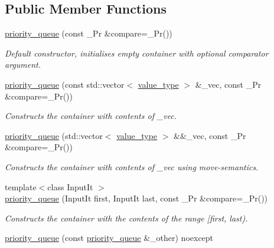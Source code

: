 \subsection*{Public Member Functions}
\begin{DoxyCompactItemize}
\item 
\hyperlink{classcrsc_1_1priority__queue_ab8754476b3d20f14d8ede97e9d399088}{priority\+\_\+queue} (const \+\_\+\+Pr \&compare=\+\_\+\+Pr())
\begin{DoxyCompactList}\small\item\em Default constructor, initialises empty container with optional comparator argument. \end{DoxyCompactList}\item 
\hyperlink{classcrsc_1_1priority__queue_a64f1b37fd1bb0e580bc60b6770b75cc9}{priority\+\_\+queue} (const std\+::vector$<$ \hyperlink{classcrsc_1_1priority__queue_a2a7d77c9465b6c918f67021e6eb926d7}{value\+\_\+type} $>$ \&\+\_\+vec, const \+\_\+\+Pr \&compare=\+\_\+\+Pr())
\begin{DoxyCompactList}\small\item\em Constructs the container with contents of {\ttfamily \+\_\+vec}. \end{DoxyCompactList}\item 
\hyperlink{classcrsc_1_1priority__queue_a2cb52360d09b98e81e1a13f70d522745}{priority\+\_\+queue} (std\+::vector$<$ \hyperlink{classcrsc_1_1priority__queue_a2a7d77c9465b6c918f67021e6eb926d7}{value\+\_\+type} $>$ \&\&\+\_\+vec, const \+\_\+\+Pr \&compare=\+\_\+\+Pr())
\begin{DoxyCompactList}\small\item\em Constructs the container with contents of {\ttfamily \+\_\+vec} using move-\/semantics. \end{DoxyCompactList}\item 
{\footnotesize template$<$class Input\+It $>$ }\\\hyperlink{classcrsc_1_1priority__queue_a702c30cd7302fc7cd7ba83e5a3f6361e}{priority\+\_\+queue} (Input\+It first, Input\+It last, const \+\_\+\+Pr \&compare=\+\_\+\+Pr())
\begin{DoxyCompactList}\small\item\em Constructs the container with the contents of the range {\ttfamily \mbox{[}first, last)}. \end{DoxyCompactList}\item 
\hyperlink{classcrsc_1_1priority__queue_a42a9483593902a7319bda777c5f68098}{priority\+\_\+queue} (const \hyperlink{classcrsc_1_1priority__queue}{priority\+\_\+queue} \&\+\_\+other) noexcept

\end{DoxyCompactItemize}
